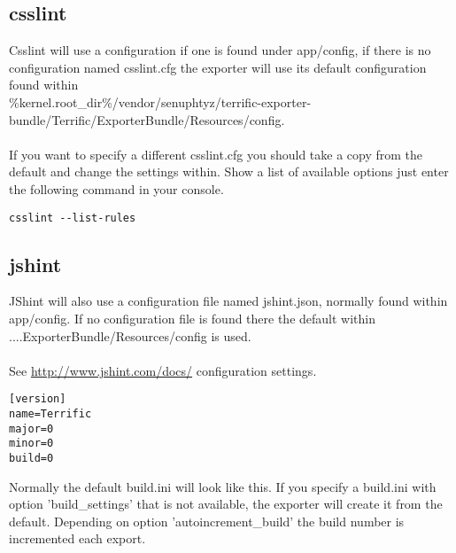 \subsection{csslint}
Csslint will use a configuration if one is found under app/config, if there is no configuration named csslint.cfg the exporter will use its default configuration found within\\
\%kernel.root\_dir\%/vendor/senuphtyz/terrific-exporter-bundle/Terrific/ExporterBundle/Resources/config. \\
\\
If you want to specify a different csslint.cfg you should take a copy from the default and change the settings within. Show a list of available options just enter the following command in your console.

\begin{verbatim}
csslint --list-rules
\end{verbatim}

\subsection{jshint}
JShint will also use a configuration file named jshint.json, normally found within app/config. If no configuration file is found there the default within ....ExporterBundle/Resources/config is used.\\
\\
See \url{http://www.jshint.com/docs/} configuration settings.\\


\begin{verbatim}
[version]
name=Terrific
major=0
minor=0
build=0
\end{verbatim}
\noindent Normally the default build.ini will look like this. If you specify a build.ini with option 'build\_settings' that is not available, the exporter will create it from the default. Depending on option 'autoincrement\_build' the build number is incremented each export.

